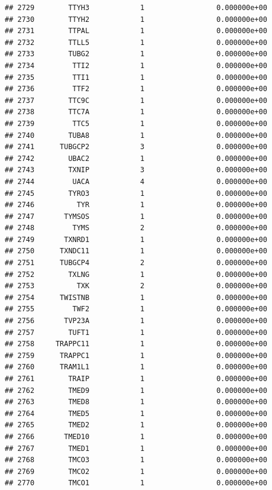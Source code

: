 \documentclass[
]{article}
\begin{document}
\begin{verbatim}
## 2729        TTYH3            1                 0.000000e+00
## 2730        TTYH2            1                 0.000000e+00
## 2731        TTPAL            1                 0.000000e+00
## 2732        TTLL5            1                 0.000000e+00
## 2733        TUBG2            1                 0.000000e+00
## 2734         TTI2            1                 0.000000e+00
## 2735         TTI1            1                 0.000000e+00
## 2736         TTF2            1                 0.000000e+00
## 2737        TTC9C            1                 0.000000e+00
## 2738        TTC7A            1                 0.000000e+00
## 2739         TTC5            1                 0.000000e+00
## 2740        TUBA8            1                 0.000000e+00
## 2741      TUBGCP2            3                 0.000000e+00
## 2742        UBAC2            1                 0.000000e+00
## 2743        TXNIP            3                 0.000000e+00
## 2744         UACA            4                 0.000000e+00
## 2745        TYRO3            1                 0.000000e+00
## 2746          TYR            1                 0.000000e+00
## 2747       TYMSOS            1                 0.000000e+00
## 2748         TYMS            2                 0.000000e+00
## 2749       TXNRD1            1                 0.000000e+00
## 2750      TXNDC11            1                 0.000000e+00
## 2751      TUBGCP4            2                 0.000000e+00
## 2752        TXLNG            1                 0.000000e+00
## 2753          TXK            2                 0.000000e+00
## 2754      TWISTNB            1                 0.000000e+00
## 2755         TWF2            1                 0.000000e+00
## 2756       TVP23A            1                 0.000000e+00
## 2757        TUFT1            1                 0.000000e+00
## 2758     TRAPPC11            1                 0.000000e+00
## 2759      TRAPPC1            1                 0.000000e+00
## 2760      TRAM1L1            1                 0.000000e+00
## 2761        TRAIP            1                 0.000000e+00
## 2762        TMED9            1                 0.000000e+00
## 2763        TMED8            1                 0.000000e+00
## 2764        TMED5            1                 0.000000e+00
## 2765        TMED2            1                 0.000000e+00
## 2766       TMED10            1                 0.000000e+00
## 2767        TMED1            1                 0.000000e+00
## 2768        TMCO3            1                 0.000000e+00
## 2769        TMCO2            1                 0.000000e+00
## 2770        TMCO1            1                 0.000000e+00

\end{verbatim}
\end{document}
